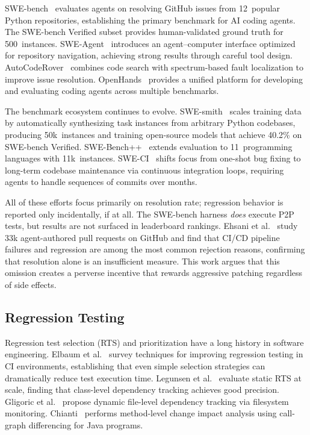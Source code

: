 \documentclass[sigconf,nonacm]{acmart}
\begin{document}
SWE-bench~\cite{jimenez2024swebench} evaluates agents on resolving GitHub
issues from 12~popular Python repositories, establishing the primary benchmark
for AI coding agents.  The SWE-bench Verified subset provides human-validated
ground truth for 500~instances.  SWE-Agent~\cite{yang2024sweagent} introduces
an agent--computer interface optimized for repository navigation, achieving
strong results through careful tool design.
AutoCodeRover~\cite{zhang2024autocoderover} combines code search with
spectrum-based fault localization to improve issue resolution.
OpenHands~\cite{wang2024openhands} provides a unified platform for developing
and evaluating coding agents across multiple benchmarks.

The benchmark ecosystem continues to evolve.
SWE-smith~\cite{yang2025swesmith} scales training data by automatically
synthesizing task instances from arbitrary Python codebases, producing
50k~instances and training open-source models that achieve 40.2\% on
SWE-bench Verified.
SWE-Bench++~\cite{wang2025swebenchpp} extends evaluation to 11~programming
languages with 11k~instances.
SWE-CI~\cite{chen2026sweci} shifts focus from one-shot bug fixing to
long-term codebase maintenance via continuous integration loops, requiring
agents to handle sequences of commits over months.

All of these efforts focus primarily on resolution rate; regression behavior
is reported only incidentally, if at all.  The SWE-bench harness \emph{does}
execute P2P tests, but results are not surfaced in leaderboard rankings.
Ehsani et al.~\cite{ehsani2026agentfail} study 33k agent-authored pull
requests on GitHub and find that CI/CD pipeline failures and regression
are among the most common rejection reasons, confirming that resolution
alone is an insufficient measure.
This work argues that this omission creates a perverse incentive that rewards
aggressive patching regardless of side effects.

\subsection{Regression Testing}

Regression test selection (RTS) and prioritization have a long history in
software engineering.  Elbaum et al.~\cite{elbaum2014techniques} survey
techniques for improving regression testing in CI environments, establishing
that even simple selection strategies can dramatically reduce test execution
time.  Legunsen et al.~\cite{legunsen2016extensive} evaluate static RTS at
scale, finding that class-level dependency tracking achieves good precision.
Gligoric et al.~\cite{gligoric2015practical} propose dynamic file-level
dependency tracking via filesystem monitoring.
Chianti~\cite{ren2004chianti} performs method-level change impact analysis
using call-graph differencing for Java programs.
\end{document}
